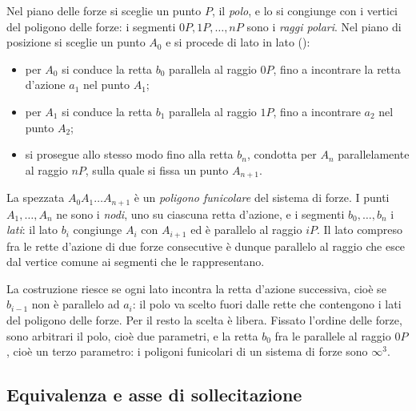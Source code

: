 Nel piano delle forze si sceglie un punto $P$, il \emph{polo}, e lo si congiunge con i vertici del
poligono delle forze: i segmenti $0P, 1P, \dots, nP$ sono i \emph{raggi polari}. Nel piano di
posizione si sceglie un punto $A_0$ e si procede di lato in lato
():
\begin{itemize}
	\item per $A_0$ si conduce la retta $b_0$ parallela al raggio $0P$, fino a incontrare la retta
	d'azione $a_1$ nel punto $A_1$;
	\item per $A_1$ si conduce la retta $b_1$ parallela al raggio $1P$, fino a incontrare $a_2$ nel
	punto $A_2$;
	\item si prosegue allo stesso modo fino alla retta $b_n$, condotta per $A_n$ parallelamente al
	raggio $nP$, sulla quale si fissa un punto $A_{n+1}$.
\end{itemize}
La spezzata $A_0 A_1 \dots A_{n+1}$ è un \emph{poligono funicolare} del sistema di forze. I punti
$A_1, \dots, A_n$ ne sono i \emph{nodi}, uno su ciascuna retta d'azione, e i segmenti
$b_0, \dots, b_n$ i \emph{lati}: il lato $b_i$ congiunge $A_i$ con $A_{i+1}$ ed è parallelo al
raggio $iP$. Il lato compreso fra le rette d'azione di due forze consecutive è dunque parallelo al
raggio che esce dal vertice comune ai segmenti che le rappresentano.

La costruzione riesce se ogni lato incontra la retta d'azione successiva, cioè se $b_{i-1}$ non è
parallelo ad $a_i$: il polo va scelto fuori dalle rette che contengono i lati del poligono delle
forze. Per il resto la scelta è libera. Fissato l'ordine delle forze, sono arbitrari il polo, cioè
due parametri, e la retta $b_0$ fra le parallele al raggio $0P$, cioè un terzo parametro: i
poligoni funicolari di un sistema di forze sono $\infty^3$.

\subsection{Equivalenza e asse di sollecitazione}
\label{sec:equivalenza_sgr}

